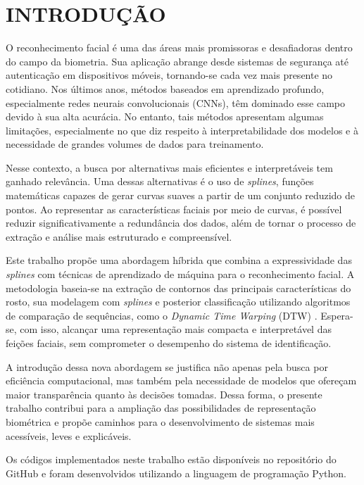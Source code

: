 \chapter{INTRODUÇÃO} \label{cha:introd}

O reconhecimento facial é uma das áreas mais promissoras e desafiadoras dentro do campo da biometria. Sua aplicação abrange desde sistemas de segurança até autenticação em dispositivos móveis, tornando-se cada vez mais presente no cotidiano. Nos últimos anos, métodos baseados em aprendizado profundo, especialmente redes neurais convolucionais (CNNs), têm dominado esse campo devido à sua alta acurácia. No entanto, tais métodos apresentam algumas limitações, especialmente no que diz respeito à interpretabilidade dos modelos e à necessidade de grandes volumes de dados para treinamento.

Nesse contexto, a busca por alternativas mais eficientes e interpretáveis tem ganhado relevância. Uma dessas alternativas é o uso de \textit{splines}, funções matemáticas capazes de gerar curvas suaves a partir de um conjunto reduzido de pontos. Ao representar as características faciais por meio de curvas, é possível reduzir significativamente a redundância dos dados, além de tornar o processo de extração e análise mais estruturado e compreensível.

Este trabalho propõe uma abordagem híbrida que combina a expressividade das \textit{splines} com técnicas de aprendizado de máquina para o reconhecimento facial. A metodologia baseia-se na extração de contornos das principais características do rosto, sua modelagem com \textit{splines} e posterior classificação utilizando algoritmos de comparação de sequências, como o \textit{Dynamic Time Warping} (DTW) \cite{SAKOE}. Espera-se, com isso, alcançar uma representação mais compacta e interpretável das feições faciais, sem comprometer o desempenho do sistema de identificação.

A introdução dessa nova abordagem se justifica não apenas pela busca por eficiência computacional, mas também pela necessidade de modelos que ofereçam maior transparência quanto às decisões tomadas. Dessa forma, o presente trabalho contribui para a ampliação das possibilidades de representação biométrica e propõe caminhos para o desenvolvimento de sistemas mais acessíveis, leves e explicáveis.

Os códigos implementados neste trabalho estão disponíveis no repositório do GitHub \citet{MeuRepositorio} e foram desenvolvidos utilizando a linguagem de programação Python.


